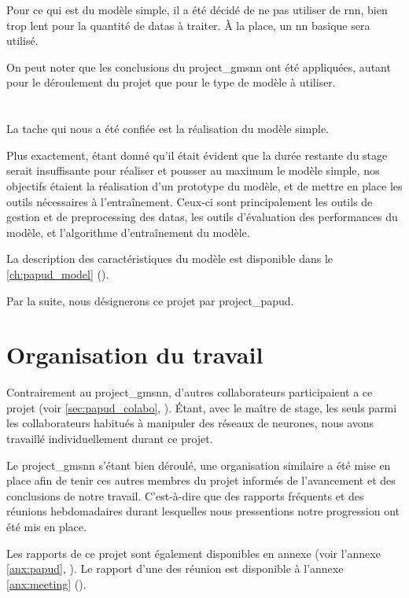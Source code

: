Pour ce qui est du modèle simple, il a été décidé de ne pas utiliser de \gls{rnn}, bien trop lent pour la quantité de \glspl{data} à traiter. À la place, un \gls{nn} basique sera utilisé.

On peut noter que les conclusions du \gls{project_gmsnn} ont été appliquées, autant pour le déroulement du projet que pour le type de modèle à utiliser.


\section{}
La tache qui nous a été confiée est la réalisation du modèle simple.

Plus exactement, étant donné qu'il était évident que la durée restante du stage serait insuffisante pour réaliser et pousser au maximum le modèle simple, nos objectifs étaient la réalisation d'un prototype du modèle, et de mettre en place les outils nécessaires à l'entraînement.
Ceux-ci sont principalement les outils de gestion et de \gls{preprocessing} des \glspl{data}, les outils d'évaluation des performances du modèle, et l'algorithme d'entraînement du modèle.

La description des caractéristiques du modèle est disponible dans le \autoref{ch:papud_model} ().

Par la suite, nous désignerons ce projet par \og \gls{project_papud}\fg{}.

\section{Organisation du travail}
Contrairement au \gls{project_gmsnn}, d'autres collaborateurs participaient a ce projet (voir \autoref{sec:papud_colabo}, ).
Étant, avec le maître de stage, les seuls parmi les collaborateurs habitués à manipuler des réseaux de neurones, nous avons travaillé individuellement durant ce projet.

Le \gls{project_gmsnn} s'étant bien déroulé, une organisation similaire a été mise en place afin de tenir ces autres membres du projet informés de l'avancement et des conclusions de notre travail.
C'est-à-dire que des rapports fréquents et des réunions hebdomadaires durant lesquelles nous pressentions notre progression ont été mis en place.

Les rapports de ce projet sont également disponibles en annexe (voir l'annexe \ref{anx:papud}, ).
Le rapport d'une des réunion est disponible à l'annexe \ref{anx:meeting} (). %

